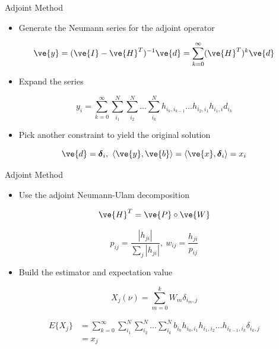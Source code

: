 \documentclass{beamer}
\begin{document}
\begin{frame}{Adjoint Method}

  \begin{itemize}
  \item Generate the Neumann series for the adjoint operator
  \end{itemize}

  \[
  \ve{y} = (\ve{I} - \ve{H}^T)^{-1} \ve{d} = \sum_{k=0}^{\infty}
  (\ve{H}^T)^k\ve{d}
  \]

  \medskip
  \begin{itemize}
  \item Expand the series
  \end{itemize}

  \[
  y_i = \sum_{k=0}^{\infty}\sum_{i_1}^{N}\sum_{i_2}^{N}\ldots
  \sum_{i_k}^{N}h_{i_k,i_{k-1}}\ldots h_{i_2,i_1} h_{i_1,i} d_{i_k}
  \]

  \medskip
  \begin{itemize}
  \item Pick another constraint to yield the original solution
  \end{itemize}

  \[
  \ve{d} = \boldsymbol{\delta}_i,\ \langle \ve{y}, \ve{b} \rangle =
  \langle \ve{x}, \boldsymbol{\delta}_i \rangle = x_i
  \]
  
\end{frame}

\begin{frame}{Adjoint Method}

  \begin{itemize}
  \item Use the adjoint Neumann-Ulam decomposition
  \end{itemize}

  \[
  \ve{H}^{T} = \ve{P} \circ \ve{W}
  \]

  \[
  p_{ij} = \frac{|h_{ji}|}{\sum_j |h_{ji}|},\ w_{ij} =
  \frac{h_{ji}}{p_{ij}}
  \]

  \medskip
  \begin{itemize}
  \item Build the estimator and expectation value
  \end{itemize}

  \[
  X_j(\nu) = \sum_{m=0}^k W_{m} \delta_{i_m,j}
  \]

  \[
  \begin{split}
    E\{X_j\} &=\sum_{k=0}^{\infty}\sum_{i_1}^{N}\sum_{i_2}^{N}\ldots
    \sum_{i_k}^{N} b_{i_0} h_{i_0,i_1}h_{i_1,i_2}\ldots h_{i_{k-1},i_k}
    \delta_{i_k,j} \\ &= x_{j}
  \end{split}
  \]

\end{frame}
\end{document}
